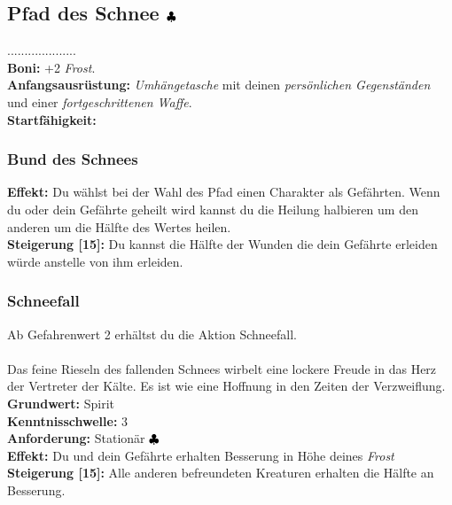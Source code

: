 \subsection*{Pfad des Schnee ${\color{blue} }{\color{black}\clubsuit}$}
....................\\
\textbf{Boni:} +2 \textit{ Frost}. \\
\textbf{Anfangsausrüstung:} \textit{Umhängetasche} mit deinen \textit{persönlichen Gegenständen} und einer \textit{fortgeschrittenen Waffe}.\\
\textbf{Startfähigkeit:}  \\

\subsubsection*{ Bund des Schnees} \label{sk:bund_des_schnees}
\textbf{Effekt:} Du wählst bei der Wahl des Pfad einen Charakter als Gefährten. Wenn du oder dein Gefährte geheilt wird kannst du die Heilung halbieren um den anderen um die Hälfte des Wertes heilen.\\
\textbf{Steigerung [15]:} Du kannst die Hälfte der Wunden die dein Gefährte erleiden würde anstelle von ihm erleiden.



\subsubsection*{ Schneefall} \label{sk:schneefall}
Ab Gefahrenwert 2 erhältst du die Aktion Schneefall.\\
\\
Das feine Rieseln des fallenden Schnees wirbelt eine lockere Freude in das Herz der Vertreter der Kälte. Es ist wie eine Hoffnung in den Zeiten der Verzweiflung.\\
\textbf{Grundwert:} Spirit \\
\textbf{Kenntnisschwelle:} 3 \\
\textbf{Anforderung:} Stationär ${\color{blue} }{\color{black}\clubsuit}$ \\
\textbf{Effekt:} Du und dein Gefährte erhalten Besserung in Höhe deines \textit{ Frost} \\
\textbf{Steigerung [15]:} Alle anderen befreundeten Kreaturen erhalten die Hälfte an Besserung.

